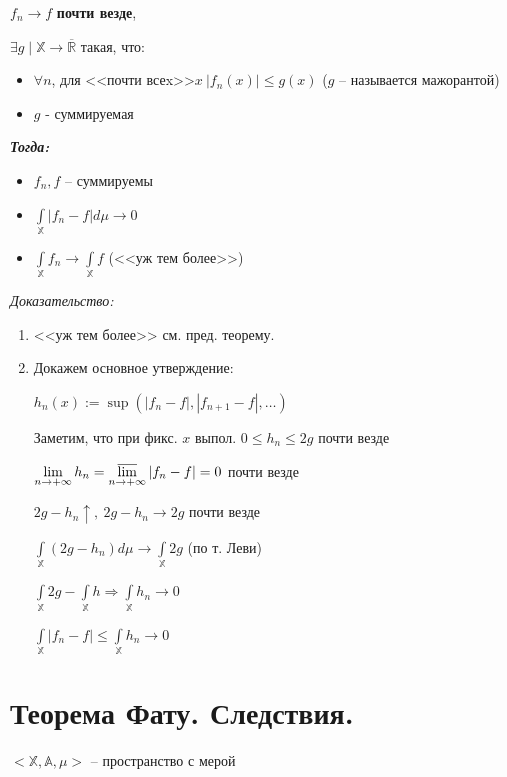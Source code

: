 \documentclass[paper=a4, fontsize=17pt]{article}
\begin{document}
$f_n \rightarrow f$ \textbf{почти везде},

$\exists g \mid \mathds{X} \rightarrow \overline{\mathds{R}}$ такая, что:
\begin{itemize}
\item
$\forall n$,  для <<почти всеx>>$x ~ |f_n(x)| \leq g(x)$ ($g$ -- называется мажорантой)
\item
$g$ - суммируемая
\end{itemize}

\emph{\textbf{Тогда:}}
\begin{itemize}
    \item $f_n, f$ -- суммируемы
    \item $\int\limits_{\mathds{X}} |f_n - f| d\mu \rightarrow 0$
    \item $\int\limits_{\mathds{X}} f_n \rightarrow \int\limits_{\mathds{X}} f$ (<<уж тем более>>)
\end{itemize}

\emph{Доказательство:}

\begin{enumerate}
	\item <<уж тем более>> см. пред. теорему.

	\item Докажем основное утверждение:

	$ h_n(x) := \sup(|f_n - f|, |f_{n+1} - f|, \dots) $

	Заметим, что при фикс. $ x $ выпол. $ 0 \leq h_n \leq 2g $ почти везде

	$ \lim\limits_{n \rightarrow +\infty} h_n =
	\varlimsup\limits_{n \rightarrow +\infty} |f_n - f| = 0 $ почти везде

	$ 2g - h_n \uparrow , ~ 2g - h_n \rightarrow 2g$ почти везде

	$ \int\limits_{\mathds{X}}(2g - h_n) d\mu \rightarrow \int\limits_{\mathds{X}} 2g $
	(по т. Леви)

	$ \int\limits_{\mathds{X}} 2g - \int\limits_{\mathds{X}} h \Rightarrow \int\limits_{\mathds{X}} h_n \rightarrow 0 $

	$ \int\limits_{\mathds{X}} |f_n - f| \leq \int\limits_{\mathds{X}} h_n \rightarrow 0 $
\end{enumerate}

\section{Теорема Фату. Следствия.}
$<\mathbb{X}, \mathbb{A}, \mu>$ -- пространство с мерой
\end{document}
